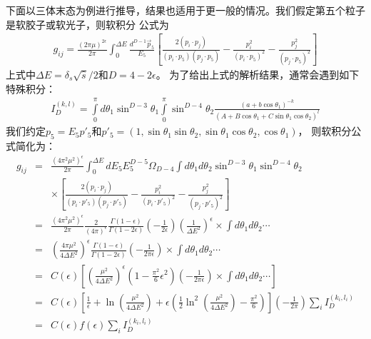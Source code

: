 下面以三体末态为例进行推导，结果也适用于更一般的情况。我们假定第五个粒子是软胶子或软光子，则软积分
公式为
\begin{eqnarray}
g_{ij} = \frac{(2\pi\mu)^{2\epsilon}}{2\pi}\int^{\Delta E}_{0} \frac{d^{D-1}\vec{p}_5}{E_5}
\left[ 
\frac{2(p_i\cdot p_j)}{(p_i\cdot p_5)(p_j\cdot p_5)} - \frac{p^2_i}{(p_i\cdot p_5)^2} 
- \frac{p^2_j}{(p_j\cdot p_5)^2}
\right]
\end{eqnarray}
上式中$\Delta E = \delta_s \sqrt{\hat{s}}/2$和$D = 4-2\epsilon$。
为了给出上式的解析结果，通常会遇到如下特殊积分：
\begin{eqnarray}
I^{(k,l)}_D = \int\limits^{\pi}_{0} d\theta_1 \sin^{D-3}\theta_1 \int\limits^{\pi}_{0} \sin^{D-4}\theta_2
\frac{(a+b\cos\theta_1)^{-k}}{(A+B\cos\theta_1+C\sin\theta_1\cos\theta_2)^l}
\end{eqnarray}
我们约定$p_5 = E_5 p'_5$和$p'_5 = (1,\sin\theta_1\sin\theta_2, \sin\theta_1\cos\theta_2, \cos\theta_1)$，
则软积分公式简化为：
\begin{eqnarray}
g_{ij} &=& \frac{(4\pi^2\mu^2)^{\epsilon}}{2\pi}\int^{\Delta E}_{0}dE_5 E^{D-5}_5 \Omega_{D-4}
\int d\theta_1 d\theta_2 \sin^{D-3}\theta_1 \sin^{D-4}\theta_2 
\nonumber \\
&& \times \left[
\frac{2(p_i\cdot p_j)}{(p_i\cdot p'_5)(p_j\cdot p'_5)} - \frac{p^2_i}{(p_i\cdot p'_5)^2} 
- \frac{p^2_j}{(p_j\cdot p'_5)^2}
\right]
\nonumber \\
&=& \frac{(4\pi^2\mu^2)^{\epsilon}}{2\pi} \frac{2}{(4\pi)^{\epsilon}} 
\frac{\Gamma(1-\epsilon)}{\Gamma(1-2\epsilon)}\left(-\frac{1}{2\epsilon}\right)\left(\frac{1}{\Delta E^2}
\right)^{\epsilon}\times \int d\theta_1 d\theta_2 \cdots
\nonumber \\
&=& \left(\frac{4\pi\mu^2}{4\Delta E^2}\right)^{\epsilon} \frac{\Gamma(1-\epsilon)}{\Gamma(1-2\epsilon)}
\left(-\frac{1}{2\pi\epsilon}\right) \times \int d\theta_1 d\theta_2 \cdots
\nonumber \\
&=& C(\epsilon)\left[\left(\frac{\mu^2}{4\Delta E^2}\right)^{\epsilon} \left(1-\frac{\pi^2}{6}
\epsilon^2\right) \left(-\frac{1}{2\pi\epsilon}\right)\times \int d\theta_1 d\theta_2 \cdots \right]
\nonumber \\
&=& C(\epsilon) \left[\frac{1}{\epsilon} + \ln\left( \frac{\mu^2}{4\Delta E^2} \right)
+\epsilon \left( \frac{1}{2}\ln^2\left(\frac{\mu^2}{4\Delta E^2} \right) - \frac{\pi^2}{6}\right)\right]
\left(-\frac{1}{2\pi} \right) \sum_i I^{(k_i,l_i)}_D
\nonumber \\
&=& C(\epsilon) f(\epsilon) \sum_i I^{(k_i,l_i)}_D
\end{eqnarray}


